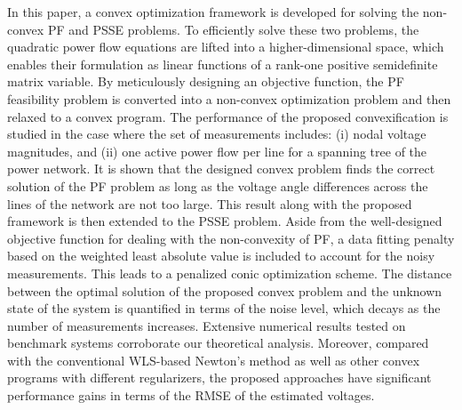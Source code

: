 \documentclass[journal,twoside]{IEEEtran}
\begin{document}
In this paper, a convex optimization framework is developed for solving the non-convex PF and PSSE problems.
To efficiently solve these two problems, the quadratic power flow equations are lifted into a 
higher-dimensional space, which enables their formulation as linear functions of a rank-one positive semidefinite matrix variable.  By meticulously designing an objective function, the PF feasibility problem is converted into a non-convex optimization problem and then relaxed to a convex program. The performance of the proposed convexification is studied in the case where the set of measurements includes:  (i) nodal voltage magnitudes, and (ii) one active power flow per line for a spanning tree of the power network. It is shown that the designed convex problem finds the correct solution of the PF problem as long as the voltage angle differences across the lines of the network are not too large.
This result along with the proposed framework is then extended to the PSSE problem.
Aside from the well-designed objective function for dealing with the non-convexity of PF,
a data fitting penalty based on the weighted least absolute value is included
to account for the noisy  measurements. This leads to a penalized conic optimization scheme.
The distance between the optimal solution of the proposed convex problem and the unknown state of the system is quantified in terms of the noise level,
which decays as the number of measurements increases. 
Extensive numerical results tested on benchmark systems corroborate our theoretical analysis.
Moreover, compared with the conventional WLS-based Newton's method as well as other convex programs with different regularizers, the proposed approaches have significant performance gains in terms of the RMSE of the estimated voltages.

\appendix
\end{document}
